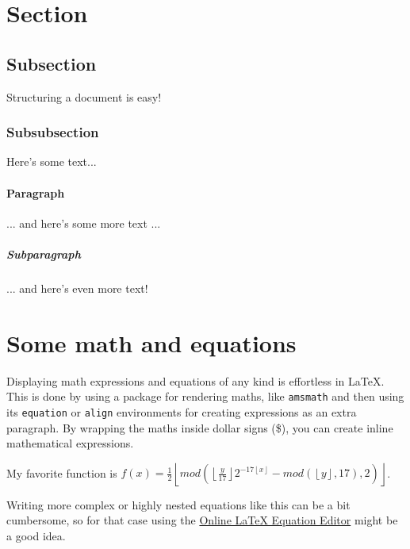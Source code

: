 \documentclass{article}
\begin{document}
\doublespacing          %

\maketitle
\newpage

\tableofcontents
\newpage

\listoffigures
\newpage

\listoftables
\newpage

\singlespacing

\section{Section}

\HelloWorld

\subsection{Subsection}

Structuring a document is easy!

\subsubsection{Subsubsection}

Here's some text...

\paragraph{Paragraph}

... and here's some more text ...

\subparagraph{Subparagraph}

... and here's even more text!

\section{Some math and equations}

Displaying math expressions and equations of any kind is effortless in \LaTeX.
This is done by using a package for rendering maths, like \texttt{amsmath} and
then using its \texttt{equation} or \texttt{align} environments for creating
expressions as an extra paragraph. By wrapping the maths inside dollar signs
(\$), you can create inline mathematical expressions.
\begin{center}
    My favorite function is
    $f(x) = \frac{1}{2} \left\lfloor
        mod\left(
            \left\lfloor \frac{y}{17} \right\rfloor
            2^{-17\left\lfloor x \right\rfloor} -
            mod\left( \left\lfloor y \right\rfloor, 17 \right), 2
        \right)
    \right\rfloor$.
\end{center}
Writing more complex or highly nested equations like this can be a bit
cumbersome, so for that case using the
\href{https://latexeditor.lagrida.com/} {Online LaTeX Equation Editor}
might be a good idea.
\end{document}
